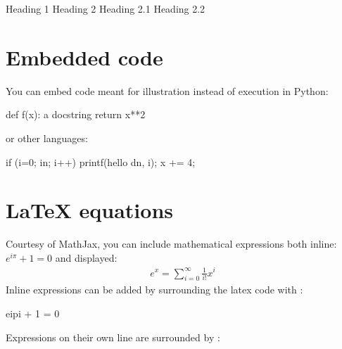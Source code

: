 \documentclass[letterpaper,10pt,english]{sphinxmanual}
\begin{document}
\begin{sphinxVerbatim}[commandchars=\\\{\}]
\PYGZsh{} Heading 1
\PYGZsh{} Heading 2
\PYGZsh{}\PYGZsh{} Heading 2.1
\PYGZsh{}\PYGZsh{} Heading 2.2
\end{sphinxVerbatim}


\section{Embedded code}
\label{\detokenize{notebooks/Intro/EditCells:Embedded-code}}
\sphinxAtStartPar
You can embed code meant for illustration instead of execution in Python:

\begin{sphinxVerbatim}[commandchars=\\\{\}]
def f(x):
    \PYGZdq{}\PYGZdq{}\PYGZdq{}a docstring\PYGZdq{}\PYGZdq{}\PYGZdq{}
    return x**2
\end{sphinxVerbatim}

\sphinxAtStartPar
or other languages:

\begin{sphinxVerbatim}[commandchars=\\\{\}]
if (i=0; i\PYGZlt{}n; i++) \PYGZob{}
  printf(\PYGZdq{}hello \PYGZpc{}d\PYGZbs{}n\PYGZdq{}, i);
  x += 4;
\PYGZcb{}
\end{sphinxVerbatim}


\section{LaTeX equations}
\label{\detokenize{notebooks/Intro/EditCells:LaTeX-equations}}
\sphinxAtStartPar
Courtesy of MathJax, you can include mathematical expressions both inline: \(e^{i\pi} + 1 = 0\) and displayed:
\begin{equation*}
\begin{split}e^x=\sum_{i=0}^\infty \frac{1}{i!}x^i\end{split}
\end{equation*}
\sphinxAtStartPar
Inline expressions can be added by surrounding the latex code with \sphinxcode{\sphinxupquote{\$}}:

\begin{sphinxVerbatim}[commandchars=\\\{\}]
\PYGZdl{}e\PYGZca{}\PYGZob{}i\PYGZbs{}pi\PYGZcb{} + 1 = 0\PYGZdl{}
\end{sphinxVerbatim}

\sphinxAtStartPar
Expressions on their own line are surrounded by \sphinxcode{\sphinxupquote{\$\$}}:
\end{document}

